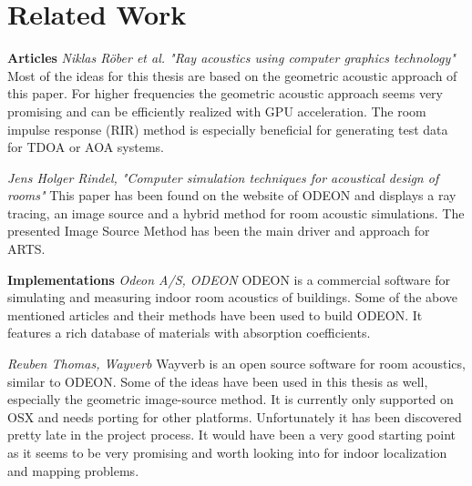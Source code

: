\chapter{Related Work}\label{chap:relatedwork}

\textbf{Articles}\newline
\cite{rober2007ray} \textit{Niklas Röber et al. "Ray acoustics using computer graphics technology"} \newline
Most of the ideas for this thesis are based on the geometric acoustic approach of this paper.
For higher frequencies the geometric acoustic approach seems very promising and can be efficiently realized with GPU acceleration.
The room impulse response (RIR) method is especially beneficial for generating test data for TDOA or AOA systems.

\cite{rindel1995computer} \textit{Jens Holger Rindel, "Computer simulation techniques for acoustical design of rooms"} \newline
This paper has been found on the website of ODEON and displays a ray tracing, an image source and a hybrid method for room acoustic simulations.
The presented Image Source Method has been the main driver and approach for ARTS.

\textbf{Implementations}\newline
\cite{odeon} \textit{Odeon A/S, ODEON} \newline
ODEON is a commercial software for simulating and measuring indoor room acoustics of buildings.
Some of the above mentioned articles and their methods have been used to build ODEON.
It features a rich database of materials with absorption coefficients.

\cite{wayverb} \textit{Reuben Thomas, Wayverb} \newline
Wayverb is an open source software for room acoustics, similar to ODEON.
Some of the ideas have been used in this thesis as well, especially the geometric image-source method.
It is currently only supported on OSX and needs porting for other platforms.
Unfortunately it has been discovered pretty late in the project process.
It would have been a very good starting point as it seems to be very promising and worth looking into for indoor localization and mapping problems.

